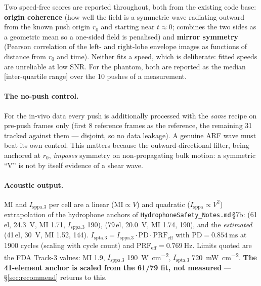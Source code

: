\documentclass[11pt,a4paper]{article}
\newcommand{\caveat}[1]{\textcolor{orange!75!black}{\textbf{#1}}}
\begin{document}
Two speed-free scores are reported throughout, both from the existing code base:
\textbf{origin coherence} (how well the field is a symmetric wave radiating outward from the known push
origin $r_0$ and starting near $t\approx0$; combines the two sides as a geometric mean so a one-sided
field is penalised) and \textbf{mirror symmetry} (Pearson correlation of the left- and right-lobe
envelope images as functions of distance from $r_0$ and time). Neither fits a speed, which is
deliberate: fitted speeds are unreliable at low SNR. For the phantom, both are reported as the median
[inter-quartile range] over the 10 pushes of a measurement.

\paragraph{The no-push control.} For the in-vivo data every push is additionally processed with the
\emph{same} recipe on pre-push frames only (first 8 reference frames as the reference, the remaining 31
tracked against them --- disjoint, so no data leakage). A genuine ARF wave must beat its own control.
This matters because the outward-directional filter, being anchored at $r_0$, \emph{imposes} symmetry
on non-propagating bulk motion: a symmetric ``V'' is not by itself evidence of a shear wave.

\paragraph{Acoustic output.} MI and $I_\mathrm{sppa.3}$ per cell are a linear ($\mathrm{MI}\propto V$)
and quadratic ($I_\mathrm{sppa}\propto V^2$) extrapolation of the hydrophone anchors of
\texttt{HydrophoneSafety\_Notes.md}\,\S7b: (61\,el, \SI{24.3}{\volt}, MI 1.71, $I_\mathrm{sppa.3}$ 190),
(79\,el, \SI{20.0}{\volt}, MI 1.74, 190), and the \emph{estimated} (41\,el, \SI{30}{\volt}, MI 1.52,
144). $I_\mathrm{spta.3} = I_\mathrm{sppa.3}\cdot \mathrm{PD}\cdot \mathrm{PRF_{eff}}$ with
$\mathrm{PD}=\SI{0.854}{\milli\second}$ at 1900 cycles (scaling with cycle count) and
$\mathrm{PRF_{eff}}=\SI{0.769}{\hertz}$. Limits quoted are the FDA Track-3 values: MI 1.9,
$I_\mathrm{sppa.3}$ \SI{190}{\watt\per\square\centi\metre}, $I_\mathrm{spta.3}$
\SI{720}{\milli\watt\per\square\centi\metre}. \caveat{The 41-element anchor is scaled from the 61/79
fit, not measured} --- \S\ref{sec:recommend} returns to this.

\end{document}
